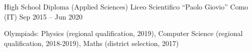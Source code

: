 
\cventry
{High School Diploma (Applied Sciences)}
{Liceo Scientifico “Paolo Giovio”}
{Como (IT)}
{Sep 2015 -- Jun 2020}
{
    \begin{cvitems}
        \item {Olympiads: Physics (regional qualification, 2019), Computer Science (regional qualification, 2018-2019), Maths (district selection, 2017)}
    \end{cvitems}
}